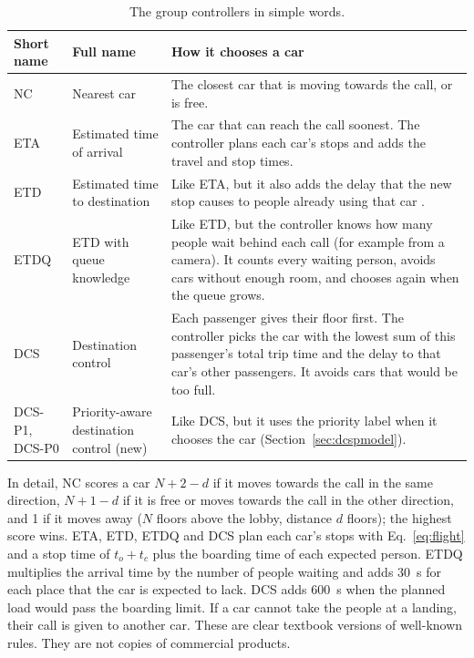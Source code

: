 \begin{table}[htbp]\centering
\caption{The group controllers in simple words.}\label{tab:controllers}
\small\begin{tabular}{@{}p{.10\linewidth}p{.22\linewidth}p{.60\linewidth}@{}}
\toprule Short name & Full name & How it chooses a car\\\midrule
NC & Nearest car & The closest car that is moving towards the call, or is free.\\
ETA & Estimated time of arrival & The car that can reach the call soonest. The controller plans each car's stops and adds the travel and stop times.\\
ETD & Estimated time to destination & Like ETA, but it also adds the delay that the new stop causes to people already using that car \cite{smith2002}.\\
ETDQ & ETD with queue knowledge & Like ETD, but the controller knows how many people wait behind each call (for example from a camera). It counts every waiting person, avoids cars without enough room, and chooses again when the queue grows.\\
DCS & Destination control & Each passenger gives their floor first. The controller picks the car with the lowest sum of this passenger's total trip time and the delay to that car's other passengers. It avoids cars that would be too full.\\
DCS-P1, DCS-P0 & Priority-aware destination control (new) & Like DCS, but it uses the priority label when it chooses the car (Section~\ref{sec:dcspmodel}).\\
\bottomrule\end{tabular}
\end{table}

In detail, NC scores a car $N+2-d$ if it moves towards the call in the same direction, $N+1-d$ if it is free or moves towards the call in the other direction, and 1 if it moves away ($N$ floors above the lobby, distance $d$ floors); the highest score wins. ETA, ETD, ETDQ and DCS plan each car's stops with Eq.~\eqref{eq:flight} and a stop time of $t_o+t_c$ plus the boarding time of each expected person. ETDQ multiplies the arrival time by the number of people waiting and adds 30~s for each place that the car is expected to lack. DCS adds 600~s when the planned load would pass the boarding limit. If a car cannot take the people at a landing, their call is given to another car. These are clear textbook versions of well-known rules. They are not copies of commercial products.

